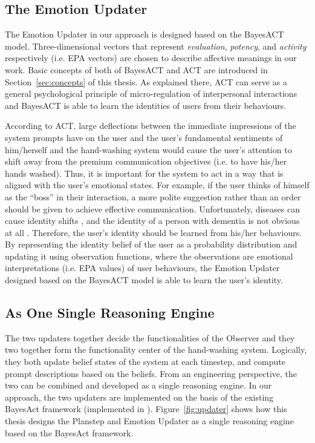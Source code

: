 \subsection{The Emotion Updater}

The Emotion Updater in our approach is designed based on the BayesACT model. Three-dimensional vectors that represent \textit{evaluation}, \textit{potency}, and \textit{activity} respectively (i.e. EPA vectors) are chosen to describe affective meanings in our work. Basic concepts of both of BayesACT and ACT are introduced in Section~\ref{sec:concepts} of this thesis. As explained there, ACT can serve as a general psychological principle of micro-regulation of interpersonal interactions and BayesACT is able to learn the identities of users from their behaviours.

According to ACT, large deflections between the immediate impressions of the system prompts have on the user and the user's fundamental sentiments of him/herself and the hand-washing system would cause the user's attention to shift away from the premium communication objectives (i.e. to have his/her hands washed). Thus, it is important for the system to act in a way that is aligned with the user's emotional states. For example, if the user thinks of himself as the ``boss'' in their interaction, a more polite suggestion rather than an order should be given to achieve effective communication. Unfortunately, diseases can cause identity shifts \cite{lively2011identity}, and the identity of a person with dementia is not obvious at all \cite{orona1990temporality, rose2004memory}. Therefore, the user's identity should be learned from his/her behaviours. By representing the identity belief of the user as a probability distribution and updating it using observation functions, where the observations are emotional interpretations (i.e. EPA values) of user behaviours, the Emotion Updater designed based on the BayesACT model is able to learn the user's identity.

\subsection{As One Single Reasoning Engine}

The two updaters together decide the functionalities of the Observer and they two together form the functionality center of the hand-washing system. Logically, they both update belief states of the system at each timestep, and compute prompt descriptions based on the beliefs. From an engineering perspective, the two can be combined and developed as a single reasoning engine. In our approach, the two updaters are implemented on the basis of the existing BayesAct framework (implemented in \cite{hoey2013bayesian}). Figure~\ref{fig:updater} shows how this thesis designs the Planstep and Emotion Updater as a single reasoning engine based on the BayesAct framework.

